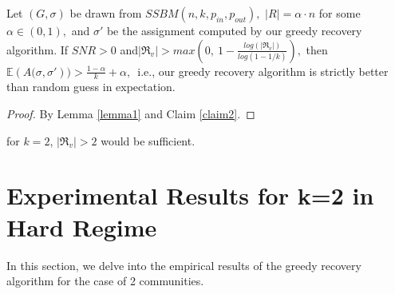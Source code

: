 \begin{corollary}
     Let $(G, \sigma)$ be drawn from $SSBM(n, k, p_{in}, p_{out}),$ $|R|=\alpha\cdot n$ for some $\alpha\in(0,1),$ and $\sigma'$ be the assignment computed by our greedy recovery algorithm. If $SNR>0$ and$|\Re_v|>max(0,~1-\frac{log(|\Re_v|)}{log(1-1/k)}),$ then $\mathbb{E}({A(\sigma, \sigma'}))>\frac{1-\alpha}{k}+\alpha,$~i.e., our greedy recovery algorithm is strictly better than random guess in expectation.
\end{corollary}
\begin{proof}
    By Lemma \ref{lemma1} and Claim \ref{claim2}.
\end{proof}
\begin{remark}
    for $k=2$, $|\Re_v|>2$ would be sufficient.
\end{remark}
\section{Experimental Results for k=2 in Hard Regime}
In this section, we delve into the empirical results of the greedy recovery algorithm for the case of 2 communities.
